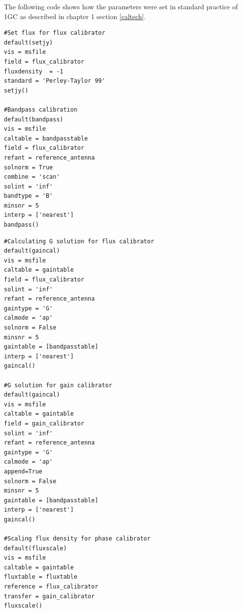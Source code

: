 The following code shows how the parameters were set in standard practice of 1GC as described in chapter 1 section \ref{caltech}.

\begin{tcolorbox}
\begin{lstlisting}
#Set flux for flux calibrator
default(setjy)
vis = msfile
field = flux_calibrator
fluxdensity  = -1
standard = 'Perley-Taylor 99'
setjy()

#Bandpass calibration
default(bandpass)
vis = msfile
caltable = bandpasstable
field = flux_calibrator
refant = reference_antenna
solnorm = True
combine = 'scan'
solint = 'inf'
bandtype = 'B'
minsnr = 5
interp = ['nearest']
bandpass()
\end{lstlisting}
\end{tcolorbox}
\begin{tcolorbox}
\begin{lstlisting}
#Calculating G solution for flux calibrator 
default(gaincal)
vis = msfile
caltable = gaintable
field = flux_calibrator
solint = 'inf'
refant = reference_antenna
gaintype = 'G'
calmode = 'ap'
solnorm = False
minsnr = 5
gaintable = [bandpasstable]
interp = ['nearest']
gaincal()
  
#G solution for gain calibrator
default(gaincal)
vis = msfile
caltable = gaintable
field = gain_calibrator
solint = 'inf'
refant = reference_antenna
gaintype = 'G'
calmode = 'ap'
append=True
solnorm = False
minsnr = 5
gaintable = [bandpasstable]
interp = ['nearest']
gaincal()   

#Scaling flux density for phase calibrator
default(fluxscale)
vis = msfile
caltable = gaintable
fluxtable = fluxtable
reference = flux_calibrator
transfer = gain_calibrator
fluxscale()
\end{lstlisting}
\citep{editioncasa}
\end{tcolorbox}


